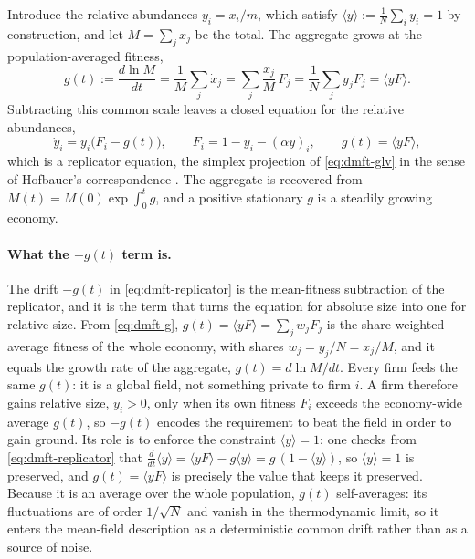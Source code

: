 Introduce the relative abundances $y_i = x_i/m$, which satisfy $\langle y\rangle :=
\frac1N\sum_i y_i = 1$ by construction, and let $M = \sum_j x_j$ be the total. The
aggregate grows at the population-averaged fitness,
\begin{equation}
    g(t) := \frac{d\ln M}{dt}
          = \frac1M\sum_j \dot x_j = \sum_j \frac{x_j}{M}\,F_j
          = \frac1N\sum_j y_j F_j = \langle yF\rangle .
    \label{eq:dmft-g}
\end{equation}
Subtracting this common scale leaves a closed equation for the relative abundances,
\begin{equation}
    \dot y_i = y_i\big(F_i - g(t)\big),\qquad
    F_i = 1 - y_i - (\alpha y)_i,\qquad
    g(t) = \langle yF\rangle ,
    \label{eq:dmft-replicator}
\end{equation}
which is a replicator equation, the simplex projection of \eqref{eq:dmft-glv} in the sense
of Hofbauer's correspondence \citep{hofbauer81}. The aggregate is recovered from
$M(t) = M(0)\exp\!\int_0^t g$, and a positive stationary $g$ is a steadily growing
economy.

\paragraph{What the $-g(t)$ term is.}
The drift $-g(t)$ in \eqref{eq:dmft-replicator} is the mean-fitness subtraction of the
replicator, and it is the term that turns the equation for absolute size into one for
relative size. From \eqref{eq:dmft-g}, $g(t) = \langle yF\rangle = \sum_j w_j F_j$ is the
share-weighted average fitness of the whole economy, with shares $w_j = y_j/N = x_j/M$,
and it equals the growth rate of the aggregate, $g(t) = d\ln M/dt$. Every firm feels the
same $g(t)$: it is a global field, not something private to firm $i$. A firm therefore
gains relative size, $\dot y_i > 0$, only when its own fitness $F_i$ exceeds the
economy-wide average $g(t)$, so $-g(t)$ encodes the requirement to beat the field in
order to gain ground. Its role is to enforce the constraint $\langle y\rangle = 1$: one
checks from \eqref{eq:dmft-replicator} that $\frac{d}{dt}\langle y\rangle = \langle
yF\rangle - g\langle y\rangle = g\,(1 - \langle y\rangle)$, so $\langle y\rangle = 1$ is
preserved, and $g(t) = \langle yF\rangle$ is precisely the value that keeps it preserved.
Because it is an average over the whole population, $g(t)$ self-averages: its fluctuations
are of order $1/\sqrt N$ and vanish in the thermodynamic limit, so it enters the mean-field
description as a deterministic common drift rather than as a source of noise.


